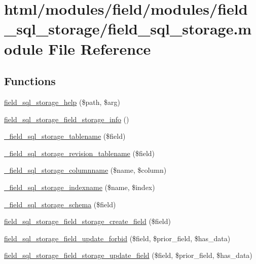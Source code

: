 \hypertarget{field__sql__storage_8module}{
\section{html/modules/field/modules/field\_\-sql\_\-storage/field\_\-sql\_\-storage.module File Reference}
\label{field__sql__storage_8module}
}
\subsection*{Functions}
\begin{DoxyCompactItemize}
\item 
\hyperlink{field__sql__storage_8module_a26218c9f78c637bacce4a328234b3359}{field\_\-sql\_\-storage\_\-help} (\$path, \$arg)
\item 
\hyperlink{field__sql__storage_8module_a2546d082d94229e0f48f668c3cf9c247}{field\_\-sql\_\-storage\_\-field\_\-storage\_\-info} ()
\item 
\hyperlink{field__sql__storage_8module_acf3b24c3e8026009fd962f450c5228ee}{\_\-field\_\-sql\_\-storage\_\-tablename} (\$field)
\item 
\hyperlink{field__sql__storage_8module_a7305341c2bf84cf2490a4e4b9886435b}{\_\-field\_\-sql\_\-storage\_\-revision\_\-tablename} (\$field)
\item 
\hyperlink{field__sql__storage_8module_a052b59d6260d1d0d9a0772133dc90364}{\_\-field\_\-sql\_\-storage\_\-columnname} (\$name, \$column)
\item 
\hyperlink{field__sql__storage_8module_af8752add19771b685ed69937003144f5}{\_\-field\_\-sql\_\-storage\_\-indexname} (\$name, \$index)
\item 
\hyperlink{field__sql__storage_8module_ae0a47fa05ecb671a55ca6b96fb092668}{\_\-field\_\-sql\_\-storage\_\-schema} (\$field)
\item 
\hyperlink{field__sql__storage_8module_aca1063eb51fc7044408b6629306f512a}{field\_\-sql\_\-storage\_\-field\_\-storage\_\-create\_\-field} (\$field)
\item 
\hyperlink{field__sql__storage_8module_a486d857f7f3c62e6bc34944a9f6baa19}{field\_\-sql\_\-storage\_\-field\_\-update\_\-forbid} (\$field, \$prior\_\-field, \$has\_\-data)
\item 
\hyperlink{field__sql__storage_8module_ac746a9fbb07c5bb7d954bf12301a1d30}{field\_\-sql\_\-storage\_\-field\_\-storage\_\-update\_\-field} (\$field, \$prior\_\-field, \$has\_\-data)

\end{DoxyCompactItemize}
